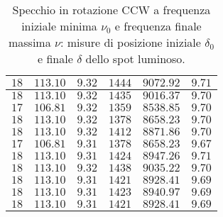 \documentclass[]{article}
\begin{document}
\begin{table}
\begin{tabular}{||c|c|c||c|c|c||}
            $18$ & $113.10$ & $9.32$ & $1444$ & $9072.92$ & $9.71$ \\\hline
            $18$ & $113.10$ & $9.32$ & $1435$ & $9016.37$ & $9.70$ \\\hline
            $17$ & $106.81$ & $9.32$ & $1359$ & $8538.85$ & $9.70$ \\\hline
            $18$ & $113.10$ & $9.32$ & $1378$ & $8658.23$ & $9.70$ \\\hline
            $18$ & $113.10$ & $9.32$ & $1412$ & $8871.86$ & $9.70$ \\\hline
            $17$ & $106.81$ & $9.31$ & $1378$ & $8658.23$ & $9.67$ \\\hline
            $18$ & $113.10$ & $9.31$ & $1424$ & $8947.26$ & $9.71$ \\\hline
            $18$ & $113.10$ & $9.32$ & $1438$ & $9035.22$ & $9.70$ \\\hline
            $18$ & $113.10$ & $9.31$ & $1421$ & $8928.41$ & $9.69$ \\\hline
            $18$ & $113.10$ & $9.31$ & $1423$ & $8940.97$ & $9.69$ \\\hline
            $18$ & $113.10$ & $9.31$ & $1421$ & $8928.41$ & $9.69$ \\\hline
        \end{tabular}
        \caption{Specchio in rotazione CCW a frequenza iniziale minima $\nu_0$ e frequenza finale massima $\nu$: misure di posizione iniziale $\delta_0$ e finale $\delta$ dello spot luminoso.}
        \label{CCW_min_max-delta-omega}
    \end{table}
\end{document}
